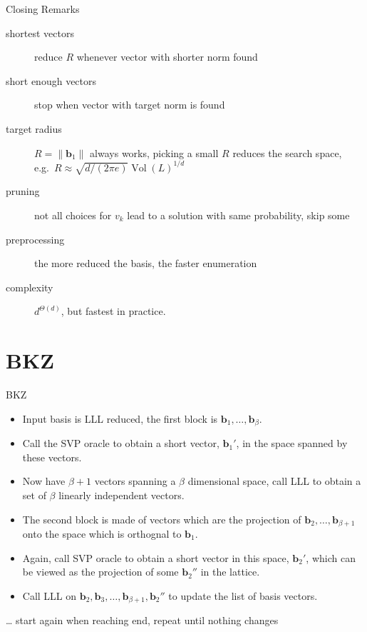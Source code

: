 \documentclass[presentation,smaller]{beamer}
\renewcommand{\vec}[1]{\mathbf{#1}\xspace}
\DeclareMathOperator{\Vol}{Vol}
\begin{document}
\begin{frame}[label={sec:org64bf358}]{Closing Remarks}
\begin{description}
\item[{shortest vectors}] reduce \(R\) whenever vector with shorter norm found
\item[{short enough vectors}] stop when vector with target norm is found
\item[{target radius}] \(R = \|\vec{b}_1\|\) always works, picking a small \(R\) reduces the search space, e.g. \(R ≈ \sqrt{d/(2πe)} \Vol(L)^{1/d}\)
\item[{pruning}] not all choices for \(v_k\) lead to a solution with same probability, skip some
\item[{preprocessing}] the more reduced the basis, the faster enumeration
\item[{complexity}] \(d^{\Theta(d)}\), but fastest in practice.
\end{description}
\end{frame}

\section{BKZ}
\label{sec:org2410d0f}
\begin{frame}[label={sec:org37734be}]{BKZ}
\begin{itemize}
\item Input basis is LLL reduced, the \alert{first block} is \(\vec{b}_1,\dots,\vec{b}_{β}\).
\item Call the SVP oracle to obtain a short vector, \(\vec{b}_1'\), in the space spanned by these vectors.
\item Now have \(β+1\) vectors spanning a \(β\) dimensional space, call LLL to obtain a set of \(β\) linearly independent vectors.
\item The \alert{second block} is made of vectors which are the projection of \(\vec{b}_2,\dots, \vec{b}_{β+1}\) onto the space which is orthognal to \(\vec{b}_1\).
\item Again, call SVP oracle to obtain a short vector in this space, \(\vec{b}_2'\), which can be viewed as the projection of some \(\vec{b}_2''\) in the lattice.
\item Call LLL on \(\vec{b}_2, \vec{b}_3,\dots, \vec{b}_{β+1}, \vec{b}_2''\) to update the list of basis vectors.
\end{itemize}

… start again when reaching end, repeat until nothing changes
\end{frame}
\end{document}
